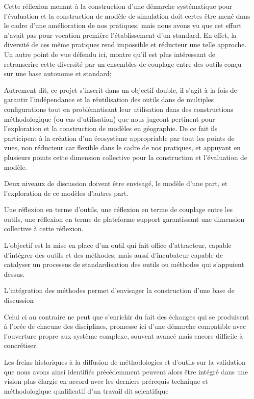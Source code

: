 Cette réflexion menant à la construction d'une démarche systématique pour l'évaluation et la construction de modèle de simulation doit certes être mené dans le cadre d'une amélioration de nos pratiques, mais nous avons vu que cet effort n'avait pas pour vocation première l'établissement d'un standard. En effet, la diversité de ces même pratiques rend impossible et réducteur une telle approche. 
Un autre point de vue défendu ici, montre qu'il est plus intéressant de retranscrire cette diversité par un ensembles de couplage entre des outils conçu sur une base autonome et standard;

Autrement dit, ce projet s'inscrit dans un objectif double, il s'agit à la fois de garantir l'indépendance et la réutilisation des outils dans de multiples configurations tout en problématisant leur utilisation dans des constructions méthodologique (ou cas d'utilisation) que nous jugeont pertinent pour l'exploration et la construction de modèles en géographie. De ce fait ils participent à la création d'un écosystème appropriable par tout les points de vues, non réducteur car flexible dans le cadre de nos pratiques, et appuyant en plusieurs points cette dimension collective pour la construction et l'évaluation de modèle.

Deux niveaux de discussion doivent être envisagé, le modèle d'une part, et l'exploration de ce modèles d'autres part.

Une réflexion en terme d'outils, une réflexion en terme de couplage entre les outils, une réflexion en terme de plateforme support garantissant une dimension collective à cette réflexion.

L'objectif est la mise en place d'un outil qui fait office d'attracteur,  capable d'intégrer des outils et des méthodes, mais aussi d'incubateur capable de catalyser un processus de standardisation des outils ou méthodes qui s'appuient dessus. 

L'intégration des méthodes permet d'envisager la construction d'une base de discussion

Celui ci au contraire ne peut que s'enrichir du fait des échanges qui se produisent à l'orée de chacune des disciplines, promesse ici d'une démarche compatible avec l'ouverture propre aux système complexe, souvent avancé mais encore difficile à concrétiser.
 
Les freins historiques à la diffusion de méthodologies et d'outils sur la validation que nous avons ainsi identifiés précédemment peuvent alors être intégré dans une vision plus élargie en accord avec les derniers prérequis technique et méthodologique qualificatif d'un travail dit scientifique

